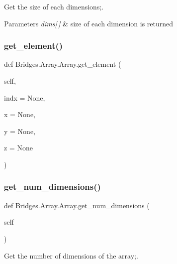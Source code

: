 Get the size of each dimensions;. 


\begin{DoxyParams}{Parameters}
{\em dims\mbox{[}$\,$\mbox{]}} & size of each dimension is returned \\
\hline
\end{DoxyParams}
\mbox{\label{class_bridges_1_1_array_1_1_array_a3bc6a21dcf8792e45e39129044d186db}} 
\subsubsection{\texorpdfstring{get\+\_\+element()}{get\_element()}}
{\footnotesize\ttfamily def Bridges.\+Array.\+Array.\+get\+\_\+element (\begin{DoxyParamCaption}\item[{}]{self,  }\item[{}]{indx = {\ttfamily None},  }\item[{}]{x = {\ttfamily None},  }\item[{}]{y = {\ttfamily None},  }\item[{}]{z = {\ttfamily None} }\end{DoxyParamCaption})}

\mbox{\label{class_bridges_1_1_array_1_1_array_afa88ea678d74409768912cbb4026b65e}} 
\subsubsection{\texorpdfstring{get\+\_\+num\+\_\+dimensions()}{get\_num\_dimensions()}}
{\footnotesize\ttfamily def Bridges.\+Array.\+Array.\+get\+\_\+num\+\_\+dimensions (\begin{DoxyParamCaption}\item[{}]{self }\end{DoxyParamCaption})}



Get the number of dimensions of the array;. 

